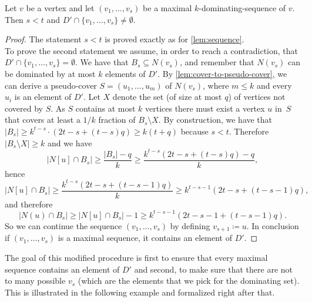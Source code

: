 \begin{lemma}\label{lem:max-dom-sequence}
Let $v$ be a vertex %
and let
$(v_1,\ldots, v_s)$ be a maximal $k$-dominating-sequence of $v$. Then $s<t$ and
$D'\cap \{v_1,\ldots, v_s\}\neq \emptyset$.
\end{lemma}
\begin{proof}
  The statement $s<t$ is proved exactly as for \cref{lem:sequence}.\\
  To prove the second statement we assume, in order to reach
  a contradiction, that $D'\cap\{ v_1,\ldots, v_s\}=\emptyset$.
  We have that $B_s \subseteq N(v_s)$, and remember that $N(v_s)$ can be
  dominated by at most $k$ elements of $D'$. By \cref{lem:cover-to-pseudo-cover},
  we can derive a pseudo-cover $S=(u_1,\ldots,u_m)$ of
  $N(v_s)$, where $m\le k$ and every $u_i$ is an element of $D'$.
  Let $X$ denote the set (of size at most $q$) of vertices not covered by $S$.
  As $S$ contains at most $k$ vertices there must exist a
  vertex $u$ in~$S$ that covers at least a $1/k$ fraction of
  $B_s\setminus X$.
  By construction, we have that $|B_s| \ge k^{t-s}\cdot(2t-s+(t-s)q)\ge k(t+q)$
  because $s<t$. Therefore $|B_s\setminus X| \ge k$ and we have
  $$|N[u]\cap B_{s}|\geq \frac{|B_s|-q}{k}
  \geq\frac{k^{t-s}(2t-s+(t-s)q) -q}{k},$$
  hence
  $$|N[u]\cap B_{s}| \geq\frac{k^{t-s}(2t-s+(t-s-1)q)}{k} \geq k^{t-s-1}(2t-s+(t-s-1)q),$$
  and therefore
  $$ |N(u)\cap B_{s}| \geq |N[u]\cap B_{s}|-1 \geq k^{t-s-1}(2t-s-1+(t-s-1)q).$$
  So we can continue the sequence $(v_1,\ldots,v_s)$ by defining
  $v_{s+1}\coloneqq u$. In conclusion if $(v_1,\ldots,v_s)$ is a maximal
  sequence, it contains an element of $D'$.
\end{proof}


The goal of this modified procedure is first to ensure that every maximal
sequence contains an element of $D'$ and second, to make sure that there are not
to many possible $v_s$ (which are the elements that we pick for the dominating set).
%
This is illustrated in the following example and formalized right after that.


